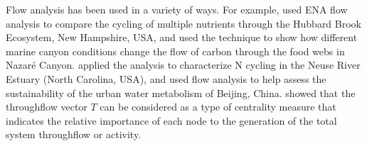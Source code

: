 \documentclass[article]{jss}
\begin{document}

Flow analysis has been used in a variety of ways.  For example,
\citet{finn80} used ENA flow analysis to compare the cycling of
multiple nutrients through the Hubbard Brook Ecosystem, New Hampshire,
USA, and \citet{vanoevelen2009cold} used the technique to show how
different marine canyon conditions change the flow of carbon through
the food webs in Nazar\'{e} Canyon.  \cite{gattie06} applied the
analysis to characterize N cycling in the Neuse River Estuary (North
Carolina, USA), and \cite{zhang10} used flow analysis to help assess
the sustainability of the urban water metabolism of Beijing, China.
\citet{borrett13} showed that the throughflow vector $T$ can be
considered as a type of centrality measure that indicates the relative
importance of each node to the generation of the total system
throughflow or activity.
\end{document}
